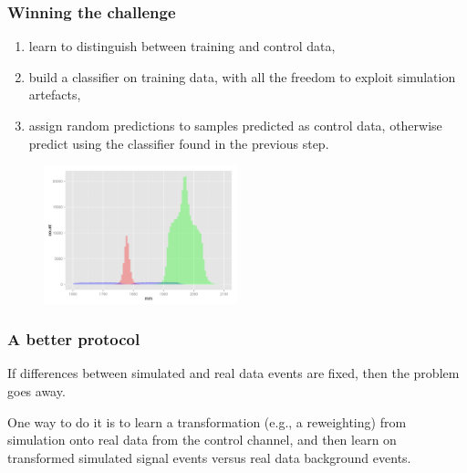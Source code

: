 \documentclass{beamer}
\begin{document}
\begin{frame}
  \frametitle{Winning the challenge}

%

\begin{enumerate}
\item learn to distinguish between training and control data,
\item build a classifier on training data, with all the freedom to exploit simulation artefacts,
\item assign random predictions to samples predicted as control data, otherwise predict using the classifier found in the previous step.
\end{enumerate}

\begin{figure}
\centering
\includegraphics[width=0.5\textwidth]{hole.png}
\end{figure}

\end{frame}

\begin{frame}
  \frametitle{A better protocol}

If differences between simulated and real data events are fixed, then the
problem goes away.

\vspace{1cm}

One way to do it is to {\color{blue} learn a transformation (e.g., a reweighting) from
simulation onto real data from the control channel}, and then learn on
transformed simulated signal events versus real data background events.

\end{frame}
\end{document}
